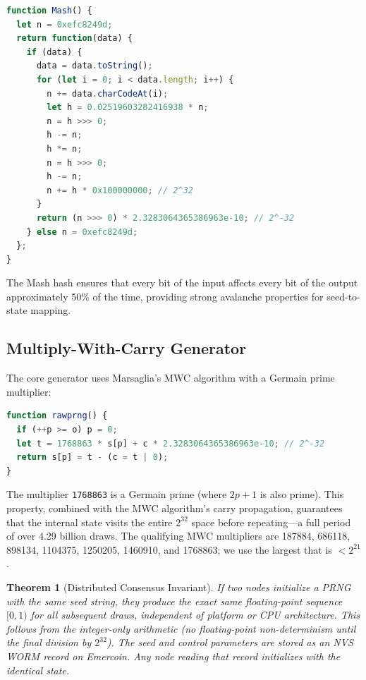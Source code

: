 \documentclass[11pt,a4paper]{article}
\newtheorem{theorem}{Theorem}[section]
\begin{document}
\begin{lstlisting}[language=JavaScript, caption={Mash hash for seed compression}]
function Mash() {
  let n = 0xefc8249d;
  return function(data) {
    if (data) {
      data = data.toString();
      for (let i = 0; i < data.length; i++) {
        n += data.charCodeAt(i);
        let h = 0.02519603282416938 * n;
        n = h >>> 0;
        h -= n;
        h *= n;
        n = h >>> 0;
        h -= n;
        n += h * 0x100000000; // 2^32
      }
      return (n >>> 0) * 2.3283064365386963e-10; // 2^-32
    } else n = 0xefc8249d;
  };
}
\end{lstlisting}

The Mash hash ensures that every bit of the input affects every bit of the output approximately 50\% of the time, providing strong avalanche properties for seed-to-state mapping.

\subsection{Multiply-With-Carry Generator}

The core generator uses Marsaglia's MWC algorithm with a Germain prime multiplier:

\begin{lstlisting}[language=JavaScript, caption={MWC generator step}]
function rawprng() {
  if (++p >= o) p = 0;
  let t = 1768863 * s[p] + c * 2.3283064365386963e-10; // 2^-32
  return s[p] = t - (c = t | 0);
}
\end{lstlisting}

The multiplier \texttt{1768863} is a Germain prime (where $2p+1$ is also prime). This property, combined with the MWC algorithm's carry propagation, guarantees that the internal state visits the entire $2^{32}$ space before repeating—a full period of over 4.29 billion draws. The qualifying MWC multipliers are 187884, 686118, 898134, 1104375, 1250205, 1460910, and 1768863; we use the largest that is $< 2^{21}$.

\begin{theorem}[Distributed Consensus Invariant]\label{thm:consensus}
If two nodes initialize a PRNG with the same seed string, they produce the exact same floating-point sequence $[0,1)$ for all subsequent draws, independent of platform or CPU architecture. This follows from the integer-only arithmetic (no floating-point non-determinism until the final division by $2^{32}$). The seed and control parameters are stored as an NVS WORM record on Emercoin. Any node reading that record initializes with the identical state.
\end{theorem}
\end{document}
